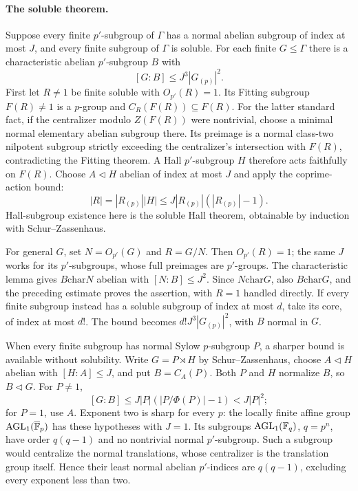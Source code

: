 \paragraph{The soluble theorem.}
Suppose every finite \(p'\)-subgroup of \(\Gamma\) has a normal
abelian subgroup of index at most \(J\), and every finite
subgroup of \(\Gamma\) is soluble. For each finite \(G\le\Gamma\)
there is a characteristic abelian \(p'\)-subgroup \(B\) with
\[
 [G:B]\le J^3|G_{(p)}|^2.
\]
First let \(R\ne1\) be finite soluble with \(O_{p'}(R)=1\).
Its Fitting subgroup \(F(R)\ne1\) is a \(p\)-group and
\(C_R(F(R))\subseteq F(R)\).
For the latter standard fact, if the centralizer modulo \(Z(F(R))\)
were nontrivial, choose a minimal normal elementary abelian
subgroup there. Its preimage is a normal class-two nilpotent
subgroup strictly exceeding the centralizer's intersection with
\(F(R)\), contradicting the Fitting theorem.
A Hall \(p'\)-subgroup \(H\) therefore acts faithfully on \(F(R)\).
Choose \(A\lhd H\) abelian of index at most \(J\) and apply the
coprime-action bound:
\[
 |R|=|R_{(p)}||H|
 \le J|R_{(p)}|(|R_{(p)}|-1).
\]
Hall-subgroup existence here is the soluble Hall theorem,
obtainable by induction with Schur--Zassenhaus.

For general \(G\), set \(N=O_{p'}(G)\) and \(R=G/N\).
Then \(O_{p'}(R)=1\); the same \(J\) works for its \(p'\)-subgroups,
whose full preimages are \(p'\)-groups. The characteristic lemma
gives \(B\mathrel{\mathrm{char}} N\) abelian with \([N:B]\le J^2\).
Since \(N\mathrel{\mathrm{char}} G\), also \(B\mathrel{\mathrm{char}} G\), and the preceding estimate
proves the assertion, with \(R=1\) handled directly.
If every finite subgroup instead has a soluble subgroup of
index at most \(d\), take its core, of index at most \(d!\).
The bound becomes \(d!J^3|G_{(p)}|^2\), with \(B\) normal in \(G\).

When every finite subgroup has normal Sylow \(p\)-subgroup \(P\),
a sharper bound is available without solubility.
Write \(G=P\rtimes H\) by Schur--Zassenhaus, choose
\(A\lhd H\) abelian with \([H:A]\le J\), and put \(B=C_A(P)\).
Both \(P\) and \(H\) normalize \(B\), so \(B\lhd G\).
For \(P\ne1\),
\[
 [G:B]\le J|P|(|P/\Phi(P)|-1)<J|P|^2;
\]
for \(P=1\), use \(A\). Exponent two is sharp for every \(p\):
the locally finite affine group \(\operatorname{AGL}_1(\overline{\mathbb F}_p)\)
has these hypotheses with \(J=1\). Its subgroups
\(\operatorname{AGL}_1(\mathbb F_q)\), \(q=p^n\), have order \(q(q-1)\)
and no nontrivial normal \(p'\)-subgroup.
Such a subgroup would centralize the normal translations, whose
centralizer is the translation group itself.
Hence their least normal abelian \(p'\)-indices are \(q(q-1)\),
excluding every exponent less than two.

